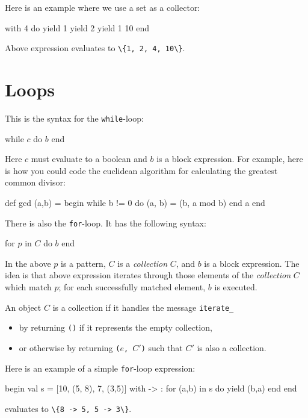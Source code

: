 \documentclass[11pt]{amsart}
\newcommand{\babelsrc}[1] {\lstinline!#1!}
\begin{document}
Here is an example where we use a set as a collector:
\begin{babellisting}
with {4} do
  yield 1
  yield 2
  yield 1
  10
end
\end{babellisting}
Above expression evaluates to \babelsrc{\{1, 2, 4, 10\}}.

\section{Loops}\label{sec:loops}
This is the syntax for the \babelsrc{while}-loop:
\begin{babellisting}
while $c$ do
  $b$
end
\end{babellisting}
Here $c$ must evaluate to a boolean and $b$ is a block expression. For example, here is how you could code the euclidean algorithm for calculating the greatest common divisor:
\begin{babellisting}
def gcd (a,b) = begin
  while b != 0 do
    (a, b) = (b, a mod b)
  end
  a
end
\end{babellisting}

There is also the \babelsrc{for}-loop. It has the following syntax:
\begin{babellisting}
for $p$ in $C$ do
  $b$
end
\end{babellisting}
In the above $p$ is a pattern, $C$ is a \emph{collection} $C$, and $b$ is a block expression.
The idea is that above expression iterates through those elements of the \emph{collection} $C$ 
which match $p$; for each successfully matched element, $b$ is executed. 

An object $C$ is a collection if it handles the message \texttt{iterate\_}
\begin{itemize}
\item by returning \texttt{()} if it represents the empty collection,
\item or otherwise by returning \texttt{($e$, $C'$)} such that $C'$ is also a collection.
\end{itemize}

Here is an example of a simple \babelsrc{for}-loop expression:
\begin{babellisting}
begin
  val s = [10, (5, 8), 7, (3,5)]
  with {->} : for (a,b) in s do
    yield (b,a)
  end
end
\end{babellisting}
evaluates to \babelsrc{\{8 -> 5, 5 -> 3\}}.
\end{document}
